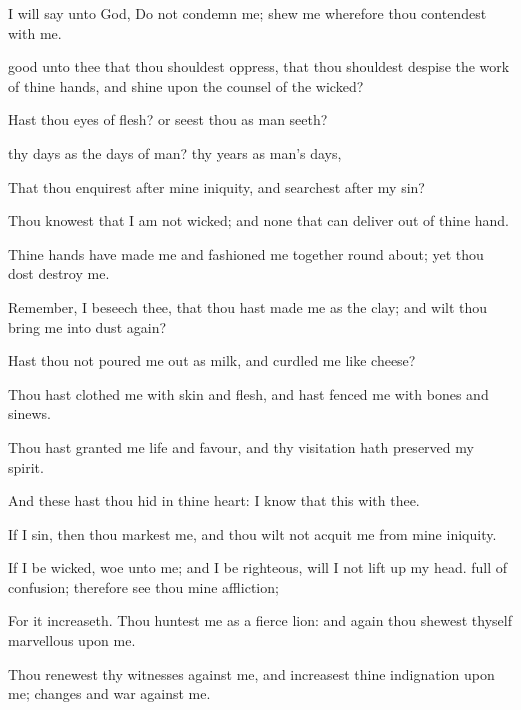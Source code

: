 {I will
say unto
God, Do not
condemn me;
shew me wherefore thou
contendest with me.

good unto thee that thou shouldest
oppress, that thou shouldest
despise the
work of thine
hands, and
shine upon the
counsel of the
wicked?

Hast thou
eyes of
flesh? or
seest thou as
man
seeth?

 thy
days as the
days of
man?
{} thy
years as
man’s
days,

That thou
enquirest after mine
iniquity, and
searchest after my
sin?

Thou
knowest that I am not
wicked; and
{} none that can
deliver out of thine
hand.


\par }{\PP {}Thine
hands have
made me and
fashioned me
together round
about; yet thou dost
destroy me.

Remember, I beseech thee, that thou hast
made me as the
clay; and wilt thou
bring me into
dust
again?

Hast thou not poured me
out as
milk, and
curdled me like
cheese?

Thou hast
clothed me with
skin and
flesh, and hast
fenced me with
bones and
sinews.

Thou hast
granted me
life and
favour, and thy
visitation hath
preserved my
spirit.

And these
{} hast thou
hid in thine
heart: I
know that this
{} with thee.


\par }{\PP {}If I
sin, then thou
markest me, and thou wilt not
acquit me from mine
iniquity.

If I be
wicked,
woe unto me; and
{} I be
righteous,
{} will I not lift
up my
head.
{}
full of
confusion; therefore
see thou mine
affliction;

For it
increaseth. Thou
huntest me as a fierce
lion: and
again thou shewest thyself
marvellous upon me.

Thou
renewest thy
witnesses against me, and
increasest thine
indignation upon
me;
changes and
war
{} against me.

}
